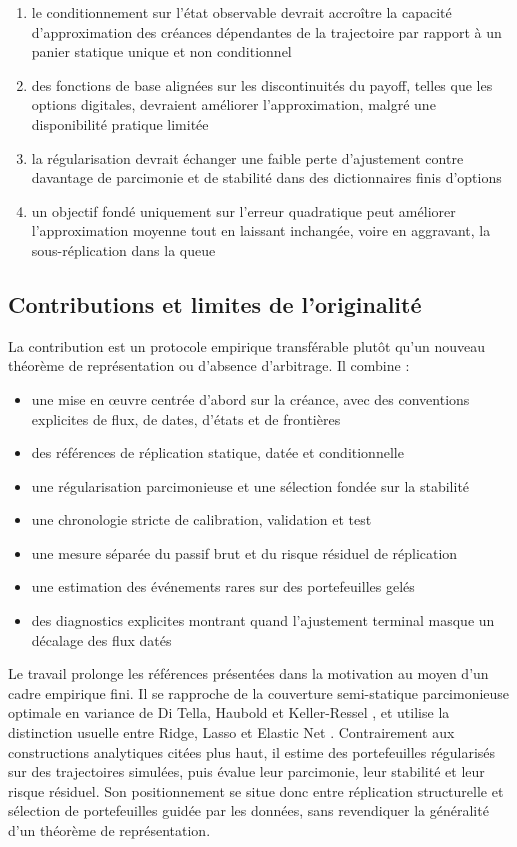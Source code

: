 \documentclass[12pt,a4paper]{article}
\newcommand{\1}{\mathbf{1}}
\begin{document}
\begin{enumerate}
\item le conditionnement sur l'état observable devrait accroître la capacité d'approximation des créances dépendantes de la trajectoire par rapport à un panier statique unique et non conditionnel
\item des fonctions de base alignées sur les discontinuités du payoff, telles que les options digitales, devraient améliorer l'approximation, malgré une disponibilité pratique limitée
\item la régularisation devrait échanger une faible perte d'ajustement contre davantage de parcimonie et de stabilité dans des dictionnaires finis d'options
\item un objectif fondé uniquement sur l'erreur quadratique peut améliorer l'approximation moyenne tout en laissant inchangée, voire en aggravant, la sous-réplication dans la queue
\end{enumerate}

\subsection{Contributions et limites de l'originalité}

La contribution est un protocole empirique transférable plutôt qu'un nouveau théorème de représentation ou d'absence d'arbitrage. Il combine :

\begin{itemize}
\item une mise en œuvre centrée d'abord sur la créance, avec des conventions explicites de flux, de dates, d'états et de frontières
\item des références de réplication statique, datée et conditionnelle
\item une régularisation parcimonieuse et une sélection fondée sur la stabilité
\item une chronologie stricte de calibration, validation et test
\item une mesure séparée du passif brut et du risque résiduel de réplication
\item une estimation des événements rares sur des portefeuilles gelés
\item des diagnostics explicites montrant quand l'ajustement terminal masque un décalage des flux datés
\end{itemize}

Le travail prolonge les références présentées dans la motivation au moyen d'un cadre empirique fini. Il se rapproche de la couverture semi-statique parcimonieuse optimale en variance de Di Tella, Haubold et Keller-Ressel \cite{ditella2019}, et utilise la distinction usuelle entre Ridge, Lasso et Elastic Net \cite{hastie2009}. Contrairement aux constructions analytiques citées plus haut, il estime des portefeuilles régularisés sur des trajectoires simulées, puis évalue leur parcimonie, leur stabilité et leur risque résiduel. Son positionnement se situe donc entre réplication structurelle et sélection de portefeuilles guidée par les données, sans revendiquer la généralité d'un théorème de représentation.
\end{document}

